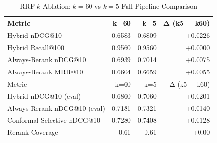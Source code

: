 \begin{table}[H]
\centering
\caption{RRF $k$ Ablation: $k=60$ vs $k=5$ Full Pipeline Comparison}
\label{tab:val_k5}
\begin{tabular}{lrrr}
\toprule
Metric & k=60 & k=5 & Δ (k5 − k60) \\
\midrule
Hybrid nDCG@10 & 0.6583 & 0.6809 & +0.0226 \\
Hybrid Recall@100 & 0.9560 & 0.9560 & +0.0000 \\
Always-Rerank nDCG@10 & 0.6939 & 0.7014 & +0.0075 \\
Always-Rerank MRR@10 & 0.6604 & 0.6659 & +0.0055 \\
Metric & k=60 & k=5 & Δ (k5 − k60) \\
Hybrid nDCG@10 (eval) & 0.6860 & 0.7060 & +0.0201 \\
Always-Rerank nDCG@10 (eval) & 0.7181 & 0.7321 & +0.0140 \\
Conformal Selective nDCG@10 & 0.7280 & 0.7408 & +0.0128 \\
Rerank Coverage & 0.61 & 0.61 & +0.00 \\
\bottomrule
\end{tabular}
\end{table}